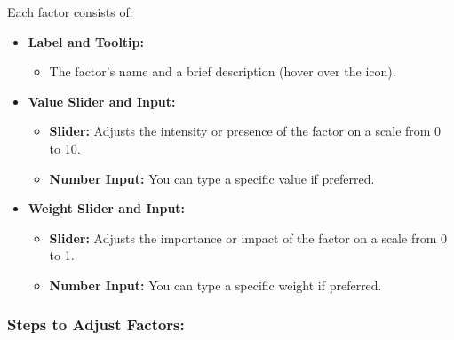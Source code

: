\documentclass[11pt]{article}
\begin{document}
Each factor consists of:

\begin{itemize}
    \item \textbf{Label and Tooltip:}
    \begin{itemize}
        \item The factor's name and a brief description (hover over the \textbf{\Info} icon).
    \end{itemize}
    \item \textbf{Value Slider and Input:}
    \begin{itemize}
        \item \textbf{Slider:} Adjusts the intensity or presence of the factor on a scale from 0 to 10.
        \item \textbf{Number Input:} You can type a specific value if preferred.
    \end{itemize}
    \item \textbf{Weight Slider and Input:}
    \begin{itemize}
        \item \textbf{Slider:} Adjusts the importance or impact of the factor on a scale from 0 to 1.
        \item \textbf{Number Input:} You can type a specific weight if preferred.
    \end{itemize}
\end{itemize}

\subsubsection*{Steps to Adjust Factors:}
\end{document}
